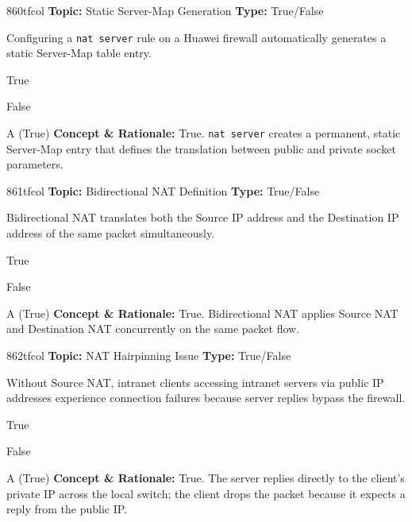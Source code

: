 \begin{qcard}{860}{tfcol}
\textcolor{darkslate!75}{\small\textbf{Topic:} Static Server-Map Generation \hfill \textbf{Type:} True/False}\vspace{0.4em}\par
Configuring a \texttt{nat server} rule on a Huawei firewall automatically generates a static Server-Map table entry.
\begin{qoptions}
\item True
\item False
\end{qoptions}
\end{qcard}
\nopagebreak
\begin{explainbox}{A (True)}
\textbf{Concept \& Rationale:} True. \texttt{nat server} creates a permanent, static Server-Map entry that defines the translation between public and private socket parameters.
\end{explainbox}

\begin{qcard}{861}{tfcol}
\textcolor{darkslate!75}{\small\textbf{Topic:} Bidirectional NAT Definition \hfill \textbf{Type:} True/False}\vspace{0.4em}\par
Bidirectional NAT translates both the Source IP address and the Destination IP address of the same packet simultaneously.
\begin{qoptions}
\item True
\item False
\end{qoptions}
\end{qcard}
\nopagebreak
\begin{explainbox}{A (True)}
\textbf{Concept \& Rationale:} True. Bidirectional NAT applies Source NAT and Destination NAT concurrently on the same packet flow.
\end{explainbox}

\begin{qcard}{862}{tfcol}
\textcolor{darkslate!75}{\small\textbf{Topic:} NAT Hairpinning Issue \hfill \textbf{Type:} True/False}\vspace{0.4em}\par
Without Source NAT, intranet clients accessing intranet servers via public IP addresses experience connection failures because server replies bypass the firewall.
\begin{qoptions}
\item True
\item False
\end{qoptions}
\end{qcard}
\nopagebreak
\begin{explainbox}{A (True)}
\textbf{Concept \& Rationale:} True. The server replies directly to the client's private IP across the local switch; the client drops the packet because it expects a reply from the public IP.
\end{explainbox}

